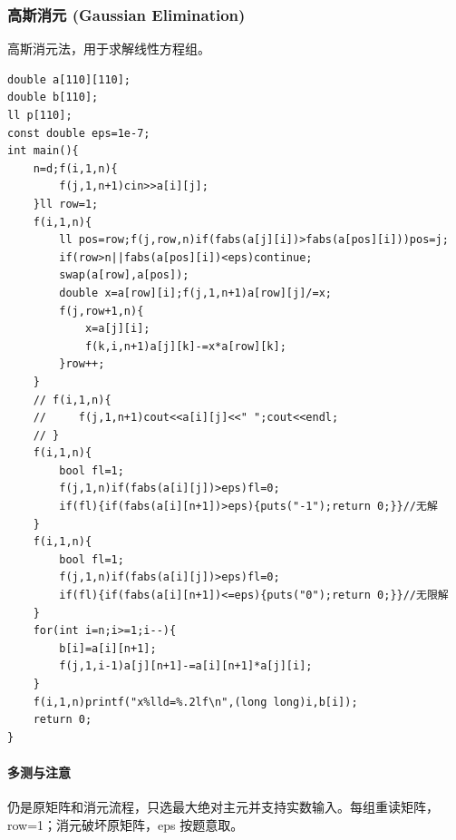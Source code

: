 \subsubsection{高斯消元 (Gaussian Elimination)}
高斯消元法，用于求解线性方程组。
\begin{lstlisting}
double a[110][110];
double b[110];
ll p[110];
const double eps=1e-7;
int main(){
	n=d;f(i,1,n){
		f(j,1,n+1)cin>>a[i][j];
	}ll row=1;
    f(i,1,n){
		ll pos=row;f(j,row,n)if(fabs(a[j][i])>fabs(a[pos][i]))pos=j;
        if(row>n||fabs(a[pos][i])<eps)continue;
		swap(a[row],a[pos]);
		double x=a[row][i];f(j,1,n+1)a[row][j]/=x;
		f(j,row+1,n){
			x=a[j][i];
			f(k,i,n+1)a[j][k]-=x*a[row][k];
		}row++;
	}
    // f(i,1,n){
    //     f(j,1,n+1)cout<<a[i][j]<<" ";cout<<endl;
    // }
    f(i,1,n){
        bool fl=1;
        f(j,1,n)if(fabs(a[i][j])>eps)fl=0;
        if(fl){if(fabs(a[i][n+1])>eps){puts("-1");return 0;}}//无解
    }
    f(i,1,n){
        bool fl=1;
        f(j,1,n)if(fabs(a[i][j])>eps)fl=0;
        if(fl){if(fabs(a[i][n+1])<=eps){puts("0");return 0;}}//无限解
    }
    for(int i=n;i>=1;i--){
		b[i]=a[i][n+1];
		f(j,1,i-1)a[j][n+1]-=a[i][n+1]*a[j][i];
	}
    f(i,1,n)printf("x%lld=%.2lf\n",(long long)i,b[i]);
	return 0;
}
\end{lstlisting}

\paragraph{多测与注意} 仍是原矩阵和消元流程，只选最大绝对主元并支持实数输入。每组重读矩阵，row=1；消元破坏原矩阵，eps 按题意取。
